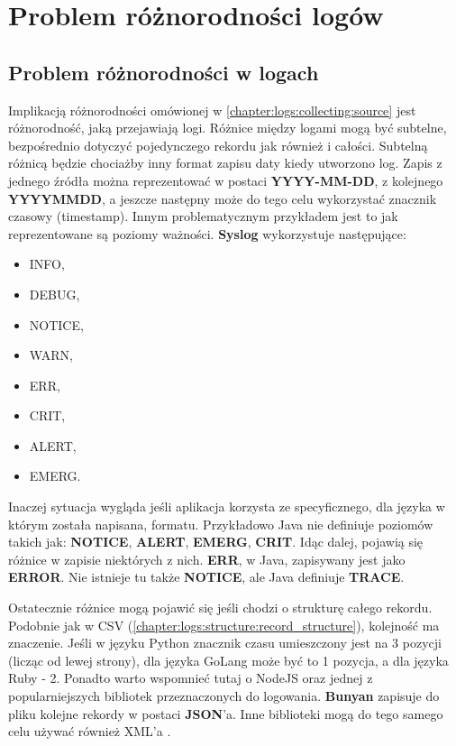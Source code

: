 \section{Problem różnorodności logów}
\label{chapter:logs:normalize}

    \subsection{Problem różnorodności w logach}
    \label{chapter:logs:normalize:differences}
    Implikacją różnorodności omówionej w \ref{chapter:logs:collecting:source} jest różnorodność, jaką przejawiają logi.
    Różnice między logami mogą być subtelne, bezpośrednio dotyczyć pojedynczego rekordu jak również i całości.
    Subtelną różnicą będzie chociażby inny format zapisu daty kiedy utworzono log. Zapis z jednego źródła można
    reprezentować w postaci \textbf{YYYY-MM-DD}, z kolejnego \textbf{YYYYMMDD}, a jeszcze następny może
    do tego celu wykorzystać znacznik czasowy (timestamp). Innym problematycznym przykładem jest to
    jak reprezentowane są poziomy ważności. \textbf{Syslog} wykorzystuje następujące:
    \begin{itemize}
        \item INFO,
        \item DEBUG,
        \item NOTICE,
        \item WARN,
        \item ERR,
        \item CRIT,
        \item ALERT,
        \item EMERG. \cite{logging_log_management}
    \end{itemize} 
    Inaczej sytuacja wygląda jeśli aplikacja korzysta ze specyficznego, dla języka w którym została napisana, formatu.
    Przykładowo Java nie definiuje poziomów takich jak: \textbf{NOTICE}, \textbf{ALERT}, \textbf{EMERG}, \textbf{CRIT}.
    Idąc dalej, pojawią się różnice w zapisie niektórych z nich. \textbf{ERR}, w Java, zapisywany jest jako \textbf{ERROR}.
    Nie istnieje tu także \textbf{NOTICE}, ale Java definiuje \textbf{TRACE}.
    
    Ostatecznie różnice mogą pojawić się jeśli chodzi o strukturę całego rekordu.
    Podobnie jak w CSV (\ref{chapter:logs:structure:record_structure}),
    kolejność ma znaczenie. Jeśli w języku Python znacznik czasu umieszczony jest na 3 pozycji 
    (licząc od lewej strony), dla języka GoLang może być to
    1 pozycja, a dla języka Ruby - 2. Ponadto warto wspomnieć tutaj o NodeJS oraz jednej z
    popularniejszych bibliotek przeznaczonych do logowania. \textbf{Bunyan} zapisuje do pliku kolejne 
    rekordy w postaci \textbf{JSON}'a. Inne biblioteki mogą do tego samego celu używać również XML'a \cite{log_management_explained}.
    

